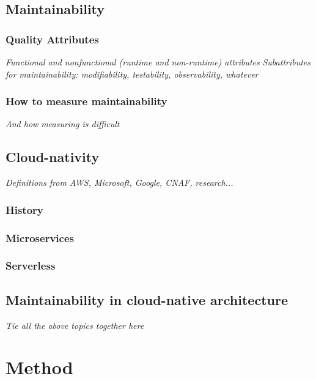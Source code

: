 \documentclass[utf8,english]{gradu3}
\newcommand{\tmp}[1]{\textit{{#1}}}
\begin{document}
\section{Maintainability}

\subsection{Quality Attributes}

\tmp{Functional and nonfunctional (runtime and non-runtime) attributes}
\tmp{Subattributes for maintainability: modifiability, testability, observability, whatever}

\subsection{How to measure maintainability}

\tmp{And how measuring is difficult}

\section{Cloud-nativity}

\tmp{Definitions from AWS, Microsoft, Google, CNAF, research...}
\subsection{History}

\subsection{Microservices}

\subsection{Serverless}

\section{Maintainability in cloud-native architecture}
\tmp{Tie all the above topics together here}

\chapter{Method}
\end{document}
